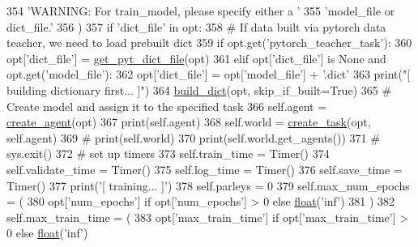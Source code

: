\begin{DoxyCode}
354                 \textcolor{stringliteral}{'WARNING: For train\_model, please specify either a '}
355                 \textcolor{stringliteral}{'model\_file or dict\_file.'}
356             )
357         \textcolor{keywordflow}{if} \textcolor{stringliteral}{'dict\_file'} \textcolor{keywordflow}{in} opt:
358             \textcolor{comment}{# If data built via pytorch data teacher, we need to load prebuilt dict}
359             \textcolor{keywordflow}{if} opt.get(\textcolor{stringliteral}{'pytorch\_teacher\_task'}):
360                 opt[\textcolor{stringliteral}{'dict\_file'}] = \hyperlink{namespaceparlai_1_1scripts_1_1build__pytorch__data_a6ec85a5842150af78f5178d75075b0cc}{get\_pyt\_dict\_file}(opt)
361             \textcolor{keywordflow}{elif} opt[\textcolor{stringliteral}{'dict\_file'}] \textcolor{keywordflow}{is} \textcolor{keywordtype}{None} \textcolor{keywordflow}{and} opt.get(\textcolor{stringliteral}{'model\_file'}):
362                 opt[\textcolor{stringliteral}{'dict\_file'}] = opt[\textcolor{stringliteral}{'model\_file'}] + \textcolor{stringliteral}{'.dict'}
363             print(\textcolor{stringliteral}{"[ building dictionary first... ]"})
364             \hyperlink{namespacebuild__dict}{build\_dict}(opt, skip\_if\_built=\textcolor{keyword}{True})
365         \textcolor{comment}{# Create model and assign it to the specified task}
366         self.agent = \hyperlink{namespaceparlai_1_1core_1_1agents_ad0d54074d4bcc148bb415ab5515a53b5}{create\_agent}(opt)
367         print(self.agent)
368         self.world = \hyperlink{namespaceparlai_1_1core_1_1worlds_a11923c10b545c7ecc1b08fe2242d9c2c}{create\_task}(opt, self.agent)
369         \textcolor{comment}{# print(self.world)}
370         print(self.world.get\_agents())
371         \textcolor{comment}{# sys.exit()}
372         \textcolor{comment}{# set up timers}
373         self.train\_time = Timer()
374         self.validate\_time = Timer()
375         self.log\_time = Timer()
376         self.save\_time = Timer()
377         print(\textcolor{stringliteral}{'[ training... ]'})
378         self.parleys = 0
379         self.max\_num\_epochs = (
380             opt[\textcolor{stringliteral}{'num\_epochs'}] \textcolor{keywordflow}{if} opt[\textcolor{stringliteral}{'num\_epochs'}] > 0 \textcolor{keywordflow}{else} \hyperlink{namespaceprojects_1_1controllable__dialogue_1_1make__control__dataset_aa2b7207688c641dbc094ab44eca27113}{float}(\textcolor{stringliteral}{'inf'})
381         )
382         self.max\_train\_time = (
383             opt[\textcolor{stringliteral}{'max\_train\_time'}] \textcolor{keywordflow}{if} opt[\textcolor{stringliteral}{'max\_train\_time'}] > 0 \textcolor{keywordflow}{else} \hyperlink{namespaceprojects_1_1controllable__dialogue_1_1make__control__dataset_aa2b7207688c641dbc094ab44eca27113}{float}(\textcolor{stringliteral}{'inf'})

\end{DoxyCode}
